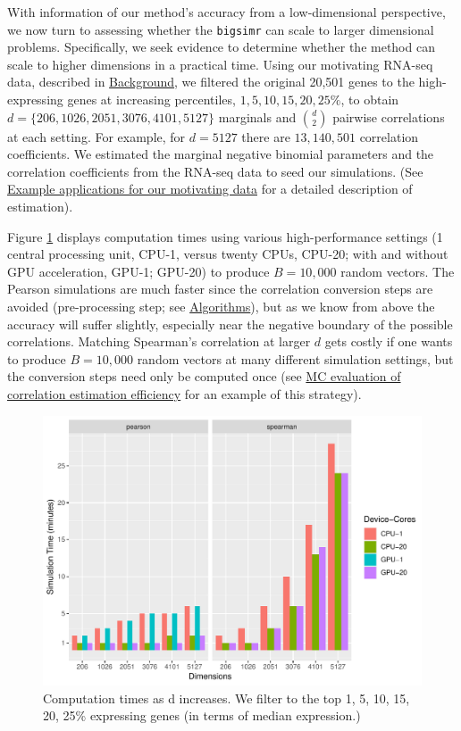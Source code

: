 \documentclass[]{article}
\begin{document}
With information of our method's accuracy from a low-dimensional perspective, we now turn to assessing whether the \texttt{bigsimr} can scale to larger dimensional problems.
Specifically, we seek evidence to determine whether the method can scale to higher dimensions in a practical time.
Using our motivating RNA-seq data, described in \href{background}{Background}, we filtered the original 20,501 genes to the high-expressing genes at increasing percentiles, \(1, 5, 10, 15, 20, 25\%\), to obtain \(d=\{206, 1026, 2051, 3076, 4101, 5127\}\) marginals and \(\binom{d}{2}\) pairwise correlations at each setting.
For example, for \(d=5127\) there are \(13,140,501\) correlation coefficients.
We estimated the marginal negative binomial parameters and the correlation coefficients from the RNA-seq data to seed our simulations.
(See \href{examples}{Example applications for our motivating data} for a detailed description of estimation).

Figure \ref{fig:ch040-gpuVScpuFig} displays computation times using various high-performance settings (1 central processing unit, CPU-1, versus twenty CPUs, CPU-20; with and without GPU acceleration, GPU-1; GPU-20) to produce \(B=10,000\) random vectors.
The Pearson simulations are much faster since the correlation conversion steps are avoided (pre-processing step; see \href{algorithms}{Algorithms}), but as we know from above the accuracy will suffer slightly, especially near the negative boundary of the possible correlations.
Matching Spearman's correlation at larger \(d\) gets costly if one wants to produce \(B=10,000\) random vectors at many different simulation settings, but the conversion steps need only be computed once (see \href{MC-evaluation-of-correlation-estimation-efficiency}{MC evaluation of correlation estimation efficiency} for an example of this strategy).

\begin{figure}

{\centering \includegraphics[width=0.8\linewidth]{fig/cpu-gpu-times} 

}

\caption{Computation times as d increases. We filter to the top 1, 5, 10, 15, 20, 25\% expressing genes (in terms of median expression.)}\label{fig:ch040-gpuVScpuFig}
\end{figure}
\end{document}
